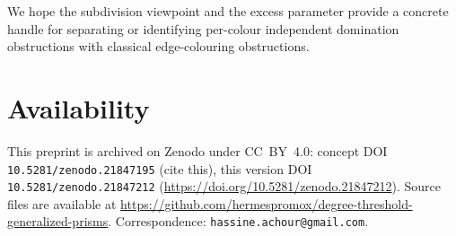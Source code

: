 \documentclass[11pt,a4paper]{article}
\theoremstyle{plain}
\theoremstyle{definition}
\begin{document}
We hope the subdivision viewpoint and the excess parameter provide a concrete handle for separating or identifying per-colour independent domination obstructions with classical edge-colouring obstructions.

\section*{Availability}

This preprint is archived on Zenodo under CC~BY~4.0: concept DOI \texttt{10.5281/zenodo.21847195} (cite this), this version DOI \texttt{10.5281/zenodo.21847212} (\url{https://doi.org/10.5281/zenodo.21847212}). Source files are available at \url{https://github.com/hermespromox/degree-threshold-generalized-prisms}. Correspondence: \texttt{hassine.achour@gmail.com}.
\end{document}
